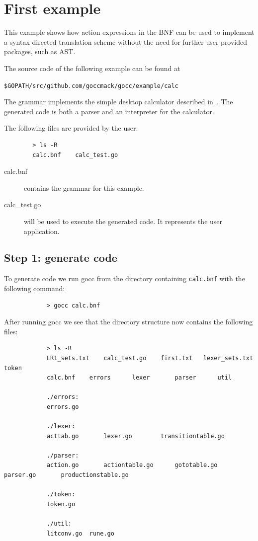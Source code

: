 \documentclass[12pt]{article}
\begin{document}
\section{First example}\label{sec:first example}
	This example shows how action expressions in the BNF can be used to implement a syntax directed translation scheme without the need for further user provided packages, such as AST.

	The source code of the following example can be found at

	\verb|$GOPATH/src/github.com/goccmack/gocc/example/calc|

	The grammar implements the simple desktop calculator described in~\cite{Dragon Book}. The generated code is both a parser and an interpreter for the calculator.

	The following files are provided by the user:
	\begin{verbatim}
		> ls -R
		calc.bnf	calc_test.go
	\end{verbatim}

	\begin{description}
		\item[calc.bnf] contains the grammar for this example.

		\item[calc\_test.go] will be used to execute the generated code. It represents the user application.

	\end{description}

	\subsection{Step 1: generate code}
		To generate code we run gocc from the directory containing \verb|calc.bnf| with the following command:

		\begin{verbatim}
			> gocc calc.bnf
		\end{verbatim}

		After running gocc we see that the directory structure now contains the following files:

		\begin{verbatim}
			> ls -R
			LR1_sets.txt	calc_test.go	first.txt	lexer_sets.txt	token
			calc.bnf	errors		lexer		parser		util

			./errors:
			errors.go

			./lexer:
			acttab.go		lexer.go		transitiontable.go

			./parser:
			action.go		actiontable.go		gototable.go		parser.go		productionstable.go

			./token:
			token.go

			./util:
			litconv.go	rune.go
		\end{verbatim}
\end{document}
